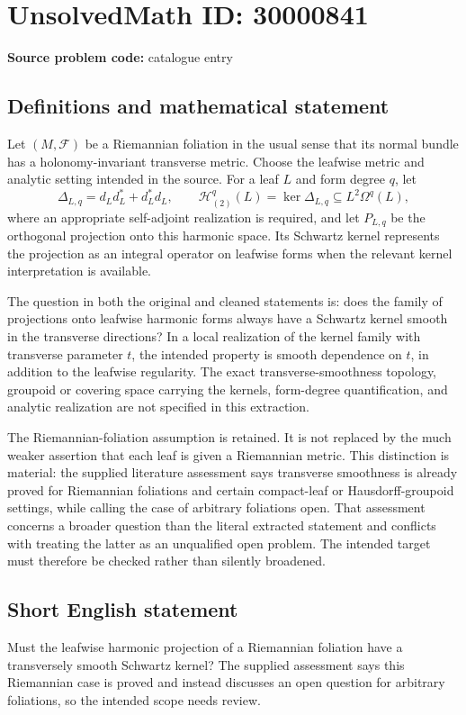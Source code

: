 \documentclass[11pt]{article}
\begin{document}
\section*{UnsolvedMath ID: 30000841}
\textbf{Source problem code:} catalogue entry
\subsection{Definitions and mathematical statement}
Let \((M,\mathcal F)\) be a Riemannian foliation in the usual sense that its normal bundle has a holonomy-invariant transverse metric. Choose the leafwise metric and analytic setting intended in the source. For a leaf \(L\) and form degree \(q\), let
\[
\Delta_{L,q}=d_Ld_L^*+d_L^*d_L,
\qquad
\mathcal H^q_{(2)}(L)=\ker\Delta_{L,q}\subseteq L^2\Omega^q(L),
\]
where an appropriate self-adjoint realization is required, and let \(P_{L,q}\) be the orthogonal projection onto this harmonic space. Its Schwartz kernel represents the projection as an integral operator on leafwise forms when the relevant kernel interpretation is available.

The question in both the original and cleaned statements is: does the family of projections onto leafwise harmonic forms always have a Schwartz kernel smooth in the transverse directions? In a local realization of the kernel family with transverse parameter \(t\), the intended property is smooth dependence on \(t\), in addition to the leafwise regularity. The exact transverse-smoothness topology, groupoid or covering space carrying the kernels, form-degree quantification, and analytic realization are not specified in this extraction.

The Riemannian-foliation assumption is retained. It is not replaced by the much weaker assertion that each leaf is given a Riemannian metric. This distinction is material: the supplied literature assessment says transverse smoothness is already proved for Riemannian foliations and certain compact-leaf or Hausdorff-groupoid settings, while calling the case of arbitrary foliations open. That assessment concerns a broader question than the literal extracted statement and conflicts with treating the latter as an unqualified open problem. The intended target must therefore be checked rather than silently broadened.
\subsection{Short English statement}
Must the leafwise harmonic projection of a Riemannian foliation have a transversely smooth Schwartz kernel? The supplied assessment says this Riemannian case is proved and instead discusses an open question for arbitrary foliations, so the intended scope needs review.
\end{document}
